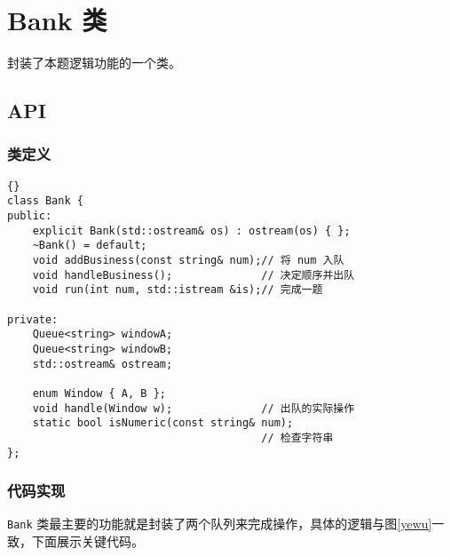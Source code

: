 \chapter{Bank 类}

封装了本题逻辑功能的一个类。

\section{API}

\subsection{类定义}
{
\begin{lstlisting}[firstnumber=154, caption=Bank 类定义]{}
class Bank {
public:
    explicit Bank(std::ostream& os) : ostream(os) { };
    ~Bank() = default;
    void addBusiness(const string& num);// 将 num 入队
    void handleBusiness();              // 决定顺序并出队
    void run(int num, std::istream &is);// 完成一题

private:
    Queue<string> windowA;
    Queue<string> windowB;
    std::ostream& ostream;

    enum Window { A, B };
    void handle(Window w);              // 出队的实际操作
    static bool isNumeric(const string& num);
                                        // 检查字符串
};
\end{lstlisting}


\subsection{代码实现}

\lstinline{Bank} 类最主要的功能就是封装了两个队列来完成操作，具体的逻辑与图\ref{yewu}一致，下面展示关键代码。

}
